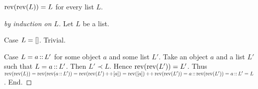 \documentclass[10pt]{article}
\begin{document}
  \begin{forthel}
    \begin{proposition}[id=LISTS_REV_1021563255448756,printid]
      $\textrm{rev}(\textrm{rev}(L)) = L$ for every list $L$.
    \end{proposition}
    \begin{proof}[by induction on $L$]
      Let $L$ be a list.

      Case $L = []$. Trivial.
    
      Case $L = a \mathop{::} L'$ for some object $a$ and some list $L'$.
        Take an object $a$ and a list $L'$ such that $L = a \mathop{::} L'$.
        Then $L' \prec L$.
        Hence $\textrm{rev}(\textrm{rev}(L')) = L'$.
        Thus $\textrm{rev}(\textrm{rev}(L))
          = \textrm{rev}(\textrm{rev}(a \mathop{::} L'))
          = \textrm{rev}(\textrm{rev}(L') \mathop{++} [a])
          = \textrm{rev}([a]) \mathop{++} \textrm{rev}(\textrm{rev}(L'))
          = a \mathop{::} \textrm{rev}(\textrm{rev}(L'))
          = a \mathop{::} L'
          = L$.
      End.
    \end{proof}
  \end{forthel}
\end{document}
